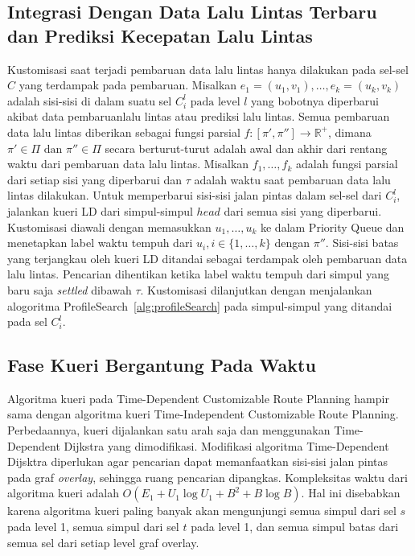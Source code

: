 \subsection{Integrasi Dengan Data Lalu Lintas Terbaru dan Prediksi Kecepatan Lalu Lintas}
\label{subsec:tdcrp-traffic-update}
Kustomisasi saat terjadi pembaruan data lalu lintas hanya dilakukan pada sel-sel $C$ yang terdampak pada pembaruan. Misalkan $e_1=(u_1,v_1),\ldots,e_k=(u_k,v_k)$ adalah sisi-sisi di dalam suatu sel $C_i^l \text{ pada level }l$ yang bobotnya diperbarui akibat data pembaruanlalu lintas atau prediksi lalu lintas. Semua pembaruan data lalu lintas diberikan sebagai fungsi parsial $f:[\pi',\pi'']\rightarrow \mathbb{R}^+$, dimana $\pi'\in \Pi \text{ dan }\pi''\in \Pi$ secara berturut-turut adalah awal dan akhir dari rentang waktu dari pembaruan data lalu lintas. Misalkan $f_1,\ldots,f_k$ adalah fungsi parsial dari setiap sisi yang diperbarui dan $\tau$ adalah waktu saat pembaruan data lalu lintas dilakukan.  Untuk memperbarui sisi-sisi jalan pintas dalam sel-sel dari $C_i^l$, jalankan kueri LD dari simpul-simpul $head$ dari semua sisi yang diperbarui. Kustomisasi diawali dengan memasukkan $u_1,\ldots,u_k$ ke dalam Priority Queue dan menetapkan label waktu tempuh dari $u_i,i\in\{1,\ldots,k\}$ dengan $\pi''$. Sisi-sisi batas yang terjangkau oleh kueri LD ditandai sebagai terdampak oleh pembaruan data lalu lintas. Pencarian dihentikan ketika label waktu tempuh dari simpul yang baru saja \textit{settled} dibawah $\tau$. Kustomisasi dilanjutkan dengan menjalankan alogoritma ProfileSearch~\ref{alg:profileSearch} pada simpul-simpul yang ditandai pada sel $C_i^l$.

\subsection{Fase Kueri Bergantung Pada Waktu}
\label{subsec:tdcrp-time-dependent-query}
Algoritma kueri pada Time-Dependent Customizable Route Planning hampir sama dengan algoritma kueri Time-Independent Customizable Route Planning. Perbedaannya, kueri dijalankan satu arah saja dan menggunakan Time-Dependent Dijkstra yang dimodifikasi. Modifikasi algoritma Time-Dependent Dijsktra diperlukan agar pencarian dapat memanfaatkan sisi-sisi jalan pintas pada graf \textit{overlay}, sehingga ruang pencarian dipangkas. Kompleksitas waktu dari algoritma kueri adalah $O(E_1+U_1\log U_1+B^{2}+B \log B)$. Hal ini disebabkan karena algoritma kueri paling banyak akan mengunjungi semua simpul dari sel $s$ pada level 1, semua simpul dari sel $t$ pada level 1, dan semua simpul batas dari semua sel dari setiap level graf overlay. 



